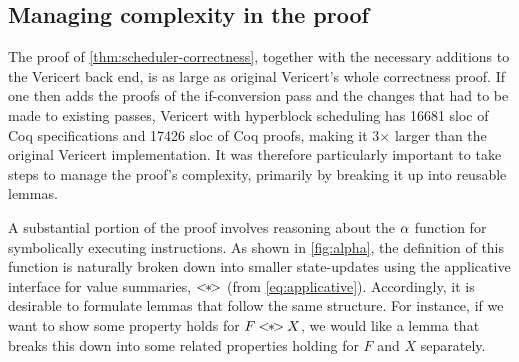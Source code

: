 {\begin{theorem}
\end{theorem}

\subsection{Managing complexity in the proof}

The proof of \cref{thm:scheduler-correctness}, together with the necessary
additions to the Vericert back end, is as large as original Vericert's whole
correctness proof. If one then adds the proofs of the if-conversion pass and the
changes that had to be made to existing passes, Vericert with hyperblock
scheduling has 16681 sloc of Coq specifications and 17426 sloc of Coq proofs,
making it 3$\times$ larger than the original Vericert implementation. It was
therefore particularly important to take steps to manage the proof's complexity,
primarily by breaking it up into reusable lemmas.

A substantial portion of the proof involves reasoning about the $\alpha$
function for symbolically executing instructions. As shown in \cref{fig:alpha},
the definition of this function is naturally broken down into smaller
state-updates using the applicative interface for value summaries, $\mathbin{<\kern-4pt *\kern-4pt >}$
(from \cref{eq:applicative}). Accordingly, it is desirable to formulate lemmas
that follow the same structure. For instance, if we want to show some property
holds for $F \mathbin{<\kern-4pt *\kern-4pt >} X$, we would like a lemma that breaks this down into some
related properties holding for $F$ and $X$ separately.

}
